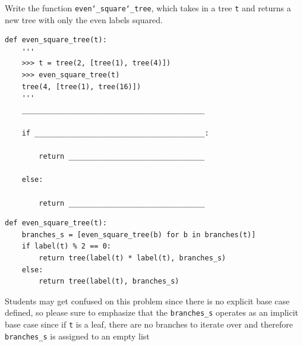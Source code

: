 \begin{blocksection}
\question Write the function \texttt{even\char`_square\char`_tree}, which takes in a
tree \texttt{t} and returns a new tree with only the even labels squared.
\end{blocksection}

\begin{lstlisting}
def even_square_tree(t):
    '''
    >>> t = tree(2, [tree(1), tree(4)])
    >>> even_square_tree(t)
    tree(4, [tree(1), tree(16)])
    '''
    ___________________________________________

    if ________________________________________:

        return ________________________________

    else:

        return ________________________________

\end{lstlisting}

\begin{solution}
\begin{lstlisting}
def even_square_tree(t):
    branches_s = [even_square_tree(b) for b in branches(t)]
    if label(t) % 2 == 0:
        return tree(label(t) * label(t), branches_s)
    else:
        return tree(label(t), branches_s)
\end{lstlisting}
\end{solution}

\begin{questionmeta}
    Students may get confused on this problem since there is no explicit base case defined,
    so please sure to emphasize that the \lstinline{branches_s} operates as an implicit base case
    since if \lstinline{t} is a leaf, there are no branches to iterate over and therefore \lstinline{branches_s}
    is assigned to an empty list
\end{questionmeta}
